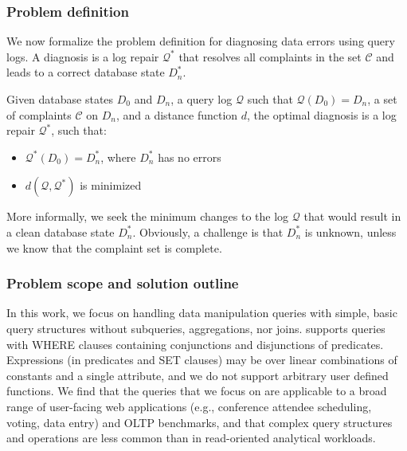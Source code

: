\subsubsection*{Problem definition}

We now formalize the problem definition for diagnosing data
errors using query logs. A diagnosis is a log repair
$\mathcal{Q}^*$ that resolves all complaints in the set $\mathcal{C}$
and leads to a correct database state $D_n^*$.
\begin{definition}\label{def:problem}
    Given database states $D_0$ and $D_n$, a query log $\mathcal{Q}$ such that $\mathcal{Q}(D_0)=D_n$, a set of complaints $\mathcal{C}$ on $D_n$,  and a distance function $d$, the optimal diagnosis is a log repair $\mathcal{Q}^*$, such that:
    \begin{itemize}[itemsep=0pt, parsep=0pt, topsep=1pt]
        \item $\mathcal{Q}^*(D_0)=D_n^*$, where $D_n^*$ has no errors
        \item $d(\mathcal{Q}, \mathcal{Q}^*)$ is minimized
    \end{itemize}
\end{definition}

More informally, we seek the minimum changes to the log $\mathcal{Q}$
that would result in a clean database state $D_n^*$. Obviously, a
challenge is that $D_n^*$ is unknown, unless we know that the
complaint set is complete. 

\subsubsection*{Problem scope and solution outline}
In this work, we focus on handling data manipulation queries with simple, basic query structures without subqueries, aggregations, nor joins.
\sys supports queries with WHERE clauses containing conjunctions and disjunctions of predicates.
Expressions (in predicates and SET clauses) may be over linear combinations of constants and a single attribute, and we do not support arbitrary user defined functions.
We find that the queries that we focus on are applicable to a broad range of user-facing web applications (e.g., conference attendee scheduling, voting,  data entry) and OLTP benchmarks, and that complex query structures and operations are less common than in read-oriented analytical workloads.



